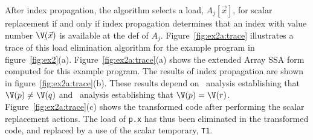 
After index propagation, the algorithm selects a load,
$A_j[\vec{x}]$, for scalar replacement if and only if index propagation
determines that an index with value number $\V(\vec{x})$ is available at the 
def of $A_j$.
Figure~\ref{fig:ex2a:trace} illustrates a trace of this load
elimination algorithm for the example program in
figure~\ref{fig:ex2}(a).  Figure~\ref{fig:ex2a:trace}(a) shows the
extended Array SSA form computed for this example program.  The results
of index propagation are shown in figure~\ref{fig:ex2a:trace}(b).
These results depend on \dd\ analysis establishing that $\V(p) \not=
\V(q)$ and \ds\ analysis establishing that $\V(p) = \V(r)$.
Figure~\ref{fig:ex2a:trace}(c) shows the transformed code after
performing the scalar replacement actions.  The load of {\tt p.x}
has thus
been eliminated in the transformed code, and replaced by a use
of the scalar temporary, {\tt T1}.

